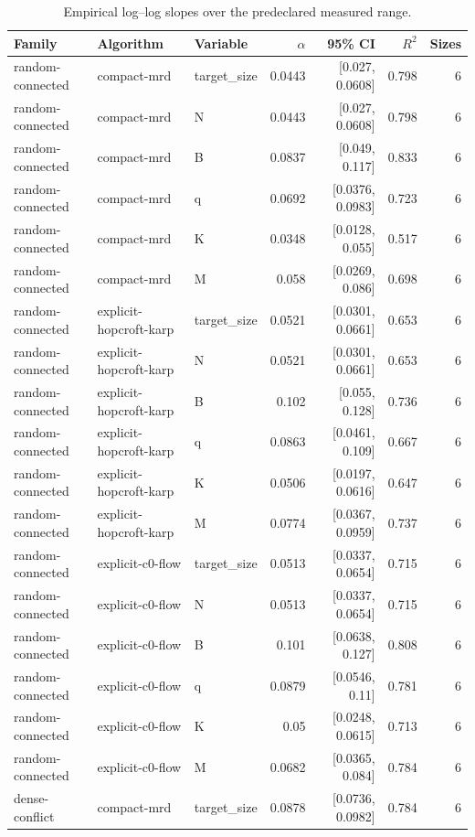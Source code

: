 \begin{table}[t]
\caption{Empirical log--log slopes over the predeclared measured range.}
\label{tab:paper-scaling-exponents}
\begin{tabular}{lllrrrr}
\toprule
Family & Algorithm & Variable & $\alpha$ & 95\% CI & $R^2$ & Sizes \\
\midrule
random-connected & compact-mrd & target_size & 0.0443 & [0.027, 0.0608] & 0.798 & 6 \\
random-connected & compact-mrd & N & 0.0443 & [0.027, 0.0608] & 0.798 & 6 \\
random-connected & compact-mrd & B & 0.0837 & [0.049, 0.117] & 0.833 & 6 \\
random-connected & compact-mrd & q & 0.0692 & [0.0376, 0.0983] & 0.723 & 6 \\
random-connected & compact-mrd & K & 0.0348 & [0.0128, 0.055] & 0.517 & 6 \\
random-connected & compact-mrd & M & 0.058 & [0.0269, 0.086] & 0.698 & 6 \\
random-connected & explicit-hopcroft-karp & target_size & 0.0521 & [0.0301, 0.0661] & 0.653 & 6 \\
random-connected & explicit-hopcroft-karp & N & 0.0521 & [0.0301, 0.0661] & 0.653 & 6 \\
random-connected & explicit-hopcroft-karp & B & 0.102 & [0.055, 0.128] & 0.736 & 6 \\
random-connected & explicit-hopcroft-karp & q & 0.0863 & [0.0461, 0.109] & 0.667 & 6 \\
random-connected & explicit-hopcroft-karp & K & 0.0506 & [0.0197, 0.0616] & 0.647 & 6 \\
random-connected & explicit-hopcroft-karp & M & 0.0774 & [0.0367, 0.0959] & 0.737 & 6 \\
random-connected & explicit-c0-flow & target_size & 0.0513 & [0.0337, 0.0654] & 0.715 & 6 \\
random-connected & explicit-c0-flow & N & 0.0513 & [0.0337, 0.0654] & 0.715 & 6 \\
random-connected & explicit-c0-flow & B & 0.101 & [0.0638, 0.127] & 0.808 & 6 \\
random-connected & explicit-c0-flow & q & 0.0879 & [0.0546, 0.11] & 0.781 & 6 \\
random-connected & explicit-c0-flow & K & 0.05 & [0.0248, 0.0615] & 0.713 & 6 \\
random-connected & explicit-c0-flow & M & 0.0682 & [0.0365, 0.084] & 0.784 & 6 \\
dense-conflict & compact-mrd & target_size & 0.0878 & [0.0736, 0.0982] & 0.784 & 6 \\

\end{tabular}
\end{table}
